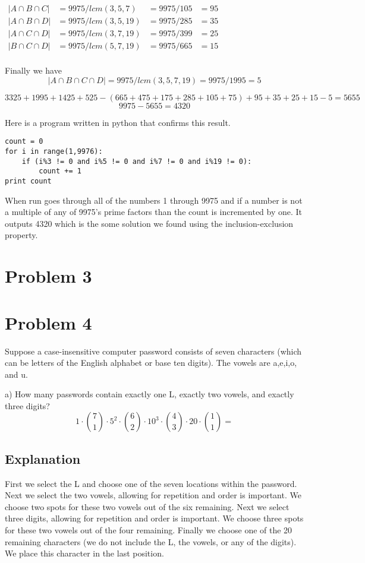 \documentclass{article}
\begin{document}
\begin{center}
$
\begin{array}{rlll}
|A\cap B\cap C| &= 9975/lcm(3,5,7)&=9975/105&=95\\
|A\cap B\cap D| &= 9975/lcm(3,5,19)&=9975/285&=35\\
|A\cap C\cap D| &= 9975/lcm(3,7,19)&=9975/399&=25\\
|B\cap C\cap D| &= 9975/lcm(5,7,19)&=9975/665&=15\\
\end{array}
$
\end{center}
Finally we have
\[|A\cap B\cap C\cap D| = 9975/lcm(3,5,7, 19)=9975/1995=5\]

\[3325+1995+1425+525 - (665+475+175+285+105+75) +95+35+25+15-5 = 5655\]
\[9975 - 5655 = 4320 \]

Here is a program written in python that confirms this result.
\begin{lstlisting}
count = 0
for i in range(1,9976):
    if (i%3 != 0 and i%5 != 0 and i%7 != 0 and i%19 != 0):
        count += 1
print count
\end{lstlisting}
When run goes through all of the numbers 1 through 9975 and if a number is not a multiple of any of 9975's prime factors than the count is incremented by one. It outputs 4320 which is the some solution we found using the inclusion-exclusion property.

\section*{Problem 3}

\section*{Problem 4}
Suppose a case-insensitive computer password consists of seven characters (which can be letters of the English alphabet or base ten digits). The vowels are a,e,i,o, and u.

\noindent a) How many passwords contain exactly one L, exactly two vowels, and exactly three digits?
\[ 1\cdot\binom 7 1 \cdot 5^2\cdot\binom 6 2 \cdot 10^3 \cdot \binom 4 3 \cdot 20 \cdot \binom 1 1 = \]
\subsection*{Explanation}
First we select the L and choose one of the seven locations within the password. Next we select the two vowels, allowing for repetition and order is important. We choose two spots for these two vowels out of the six remaining. Next we select three digits, allowing for repetition and order is important. We choose three spots for these two vowels out of the four remaining. Finally we choose one of the 20 remaining characters (we do not include the L, the vowels, or any of the digits). We place this character in the last position.
\end{document}
